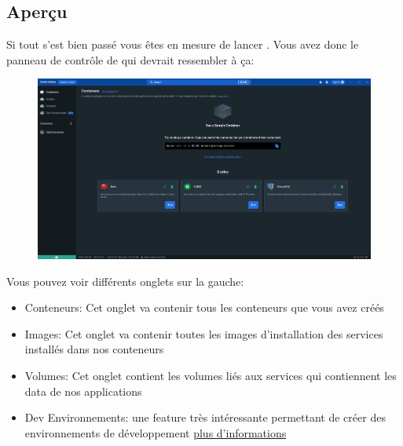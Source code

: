 \documentclass[internal]{nhitec_design}
\begin{document}
\newpage

    \subsection[Aperçu]{Aperçu}

        Si tout s'est bien passé vous êtes en mesure de lancer \dockerdesktop{}. 
        Vous avez donc le panneau de contrôle de \dockerdesktop{} qui devrait ressembler à ça:\\
        
        \begin{figure}[h]
            \centering
            \includegraphics[scale=0.25]{Images_formation/PanelDocker.png}
        \end{figure}

        Vous pouvez voir différents onglets sur la gauche:

        \begin{itemize}
            \item[] Conteneurs: Cet onglet va contenir tous les conteneurs que vous avez créés\\
            \item[] Images: Cet onglet va contenir toutes les images d'installation des services installés dans nos conteneurs\\
            \item[] Volumes: Cet onglet contient les volumes liés aux services qui contiennent les data de nos applications\\
            \item[] Dev Environnements: une feature très intéressante permettant de créer des environnements de développement \footnotesize{\href{https://docs.docker.com/desktop/dev-environments/}{plus d'informations}}
        \end{itemize}
\end{document}

